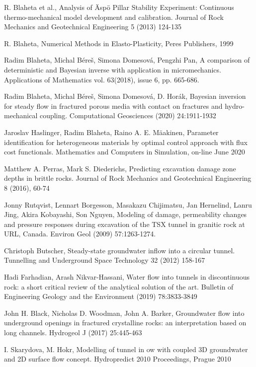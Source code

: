 \documentclass[a4paper]{article}
\begin{document}
\begin{thebibliography}{32}
	 R. Blaheta et al., Analysis of \"{A}sp\"{o} Pillar Stability Experiment: Continuous thermo-mechanical model development and calibration. Journal of
	Rock Mechanics and Geotechnical Engineering 5 (2013) 124-135
	
	 R. Blaheta, Numerical Methods in Elasto-Plasticity, Peres Publishers,
	1999
	
	 Radim Blaheta, Michal Béreš, Simona Domesová, Pengzhi Pan, A comparison
	of deterministic and Bayesian inverse with application in micromechanics.
	Applications of Mathematics vol. 63(2018), issue 6, pp.	665-686.
	
	 Radim Blaheta, Michal Béreš, Simona Domesová, D. Horák, Bayesian
	inversion for steady flow in fractured porous media with contact on
	fractures and hydro-mechanical coupling. Computational Geosciences
	(2020) 24:1911-1932
	
	 Jaroslav Haslinger, Radim Blaheta, Raino A. E. M\"{a}akinen, Parameter
	identification for heterogeneous materials by optimal control approach
	with flux cost functionals. Mathematics and Computers in Simulation,
	on-line June 2020
	
	 Matthew A. Perras, Mark S. Diederichs, Predicting excavation damage
	zone depths in brittle rocks. Journal of Rock Mechanics and Geotechnical
	Engineering 8 (2016), 60-74
	
	 Jonny Rutqvist, Lennart Borgesson, Masakazu Chijimatsu, Jan Hernelind,
	Lanru Jing, Akira Kobayashi, Son Nguyen, Modeling of damage,
	permeability changes and pressure responses during excavation of
	the TSX tunnel in granitic rock at URL, Canada. Environ Geol (2009)
	57:1263-1274.
	
	 Christoph Butscher, Steady-state groundwater inflow into a circular
	tunnel. Tunnelling and Underground Space Technology 32 (2012) 158-167
	
	 Hadi Farhadian, Arash Nikvar-Hassani, Water flow into tunnels in discontinuous
	rock: a short critical review of the analytical solution of the art. Bulletin of Engineering Geology and the Environment (2019) 78:3833-3849
	
	 John H. Black, Nicholas D. Woodman, John A. Barker, Groundwater
	flow into underground openings in fractured crystalline rocks: an
	interpretation based on long channels. Hydrogeol J (2017) 25:445-463
	
	 I. Skarydova, M. Hokr, Modelling of tunnel in
ow with coupled 3D
	groundwater and 2D surface flow concept. Hydropredict 2010 Proceedings,
	Prague 2010
	

\end{thebibliography}
\end{document}
